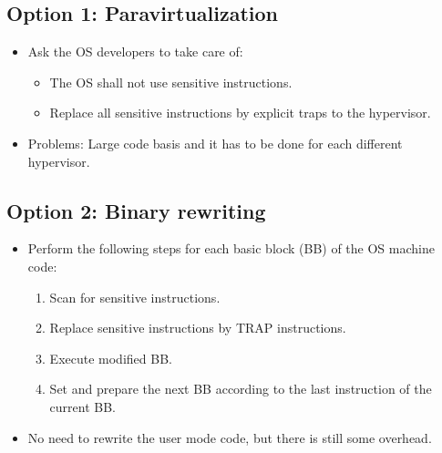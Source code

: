         \subsection{Option 1: Paravirtualization}
	        \begin{itemize}
	        	\item Ask the OS developers to take care of:
		        	\begin{itemize}
		        		\item The OS shall not use sensitive instructions.
		        		\item Replace all sensitive instructions by explicit traps to the hypervisor.
		        	\end{itemize}
	        	\item Problems: Large code basis and it has to be done for each different hypervisor.
	        \end{itemize}
    
        \subsection{Option 2: Binary rewriting}
	        \begin{itemize}
	        	\item Perform the following steps for each basic block (BB) of the OS machine code:
		        	\begin{enumerate}
		        		\item Scan for sensitive instructions.
		        		\item Replace sensitive instructions by TRAP instructions.
		        		\item Execute modified BB.
		        		\item Set and prepare the next BB according to the last instruction of the current BB.
		        	\end{enumerate}
	        	\item No need to rewrite the user mode code, but there is still some overhead.
	        \end{itemize}
        
